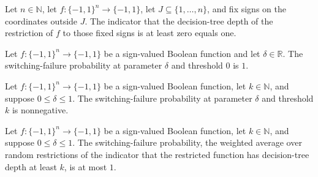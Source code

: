 \begin{theorem}
\label{FABL.switchingFailureIndicator_zero}
\leanok
{}
Let $n\in\mathbb N$, let $f:\{−1,1\}^n\to\{−1,1\}$, let $J\subseteq\{1,\ldots,n\}$, and
fix signs on the coordinates outside $J$. The indicator that the decision-tree depth of
the restriction of $f$ to those fixed signs is at least zero equals one.
\end{theorem}

\begin{theorem}
\label{FABL.switchingFailureProbability_zero}
\leanok
{}
Let $f:\{-1,1\}^n\to\{-1,1\}$ be a sign-valued Boolean function and let
$\delta\in\mathbb R$. The switching-failure probability at parameter $\delta$ and
threshold $0$ is $1$.
\end{theorem}

\begin{theorem}
\label{FABL.switchingFailureProbability_nonneg}
\leanok
{}
Let $f:\{-1,1\}^n\to\{-1,1\}$ be a sign-valued Boolean function, let $k\in\mathbb
N$, and suppose $0\le\delta\le 1$. The switching-failure probability at parameter
$\delta$ and threshold $k$ is nonnegative.
\end{theorem}

\begin{theorem}
\label{FABL.switchingFailureProbability_le_one}
\leanok
{}
Let $f:\{-1,1\}^n\to\{-1,1\}$ be a sign-valued Boolean function, let $k\in\mathbb
N$, and suppose $0\le\delta\le 1$. The switching-failure probability, the weighted
average over random restrictions of the indicator that the restricted function has
decision-tree depth at least $k$, is at most $1$.
\end{theorem}

